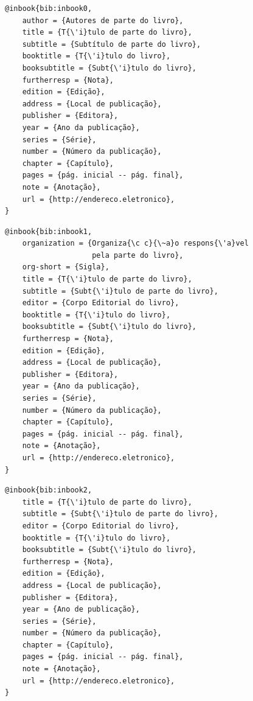 \documentclass[a4paper,12pt,oneside,onecolumn,final,fleqn]{repUERJ}
\begin{document}
\begin{verbatim}
@inbook{bib:inbook0,
    author = {Autores de parte do livro},
    title = {T{\'i}tulo de parte do livro},
    subtitle = {Subtítulo de parte do livro},
    booktitle = {T{\'i}tulo do livro},
    booksubtitle = {Subt{\'i}tulo do livro},
    furtherresp = {Nota},
    edition = {Edição},
    address = {Local de publicação},
    publisher = {Editora},
    year = {Ano da publicação},
    series = {Série},
    number = {Número da publicação},
    chapter = {Capítulo},
    pages = {pág. inicial -- pág. final},
    note = {Anotação},
    url = {http://endereco.eletronico},
}
\end{verbatim}

\noindent{}

\begin{verbatim}
@inbook{bib:inbook1,
    organization = {Organiza{\c c}{\~a}o respons{\'a}vel 
    				pela parte do livro},
    org-short = {Sigla},
    title = {T{\'i}tulo de parte do livro},
    subtitle = {Subt{\'i}tulo de parte do livro},
    editor = {Corpo Editorial do livro},
    booktitle = {T{\'i}tulo do livro},
    booksubtitle = {Subt{\'i}tulo do livro},
    furtherresp = {Nota},
    edition = {Edição},
    address = {Local de publicação},
    publisher = {Editora},
    year = {Ano da publicação},
    series = {Série},
    number = {Número da publicação},
    chapter = {Capítulo},
    pages = {pág. inicial -- pág. final},
    note = {Anotação},
    url = {http://endereco.eletronico},
}
\end{verbatim}

\noindent{}

\begin{verbatim}
@inbook{bib:inbook2,
    title = {T{\'i}tulo de parte do livro},
    subtitle = {Subt{\'i}tulo de parte do livro},
    editor = {Corpo Editorial do livro},
    booktitle = {T{\'i}tulo do livro},
    booksubtitle = {Subt{\'i}tulo do livro},
    furtherresp = {Nota},
    edition = {Edição},
    address = {Local de publicação},
    publisher = {Editora},
    year = {Ano de publicação},
    series = {Série},
    number = {Número da publicação},
    chapter = {Capítulo},
    pages = {pág. inicial -- pág. final},
    note = {Anotação},
    url = {http://endereco.eletronico},
}
\end{verbatim}

\noindent{}\\
\end{document}
